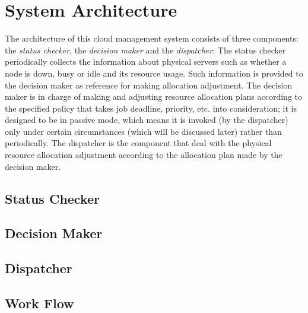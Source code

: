 \chapter{System Architecture}


The architecture of this cloud management system consists of three
components: the \emph{status checker}, the \emph{decision maker} and the
\emph{dispatcher}:  The status checker periodically collects the
information about physical servers such as whether a node is down, busy
or idle and its resource usage.  Such information is provided to the
decision maker as reference for making allocation adjustment.  The
decision maker is in charge of making and adjusting resource allocation
plans according to the specified policy that takes job deadline,
priority, etc. into consideration; it is designed to be in passive mode,
which means it is invoked (by the dispatcher) only under certain
circumstances (which will be discussed later) rather than periodically.
The dispatcher is the component that deal with the physical resource
allocation adjustment according to the allocation plan made by the
decision maker.

\section{Status Checker}

\section{Decision Maker}

\section{Dispatcher}

\section{Work Flow}

